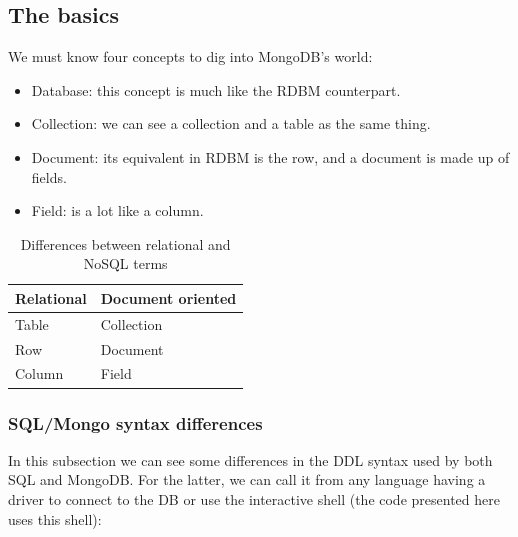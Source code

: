 \subsection{The basics}

We must know four concepts to dig into MongoDB's world:

\begin{itemize}
\item Database: this concept is much like the RDBM counterpart.
\item Collection: we can see a collection and a table as the same thing.
\item Document: its equivalent in RDBM is the row, and a document is made up of fields.
\item Field: is a lot like a column.
\end{itemize}


\begin{table}
\begin{center}
\begin{tabular}{|l|l|}
\hline
\textbf{Relational} & \textbf{Document oriented} \\ 
\hline
Table & Collection\\
\hline
Row & Document\\
\hline
Column & Field \\
\hline
\end{tabular}
\end{center}
\caption{Differences between relational and NoSQL terms}
\end{table}





\subsubsection{SQL/Mongo syntax differences}

In this subsection we can see some differences in the DDL syntax used by both SQL and MongoDB. For the latter, we can call it from any language having a driver to connect to the DB or use the interactive shell (the code presented here uses this shell): 





